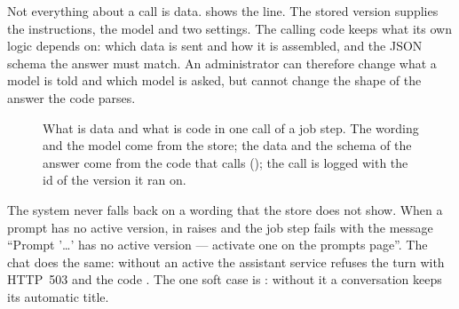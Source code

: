 Not everything about a call is data.  shows the line. The stored
version supplies the instructions, the model and two settings. The calling code keeps what its
own logic depends on: which data is sent and how it is assembled, and the JSON schema the
answer must match. An administrator can therefore change what a model is told and which model
is asked, but cannot change the shape of the answer the code parses.

\begin{figure}[H]
\centering
{}
\actorlegend
\caption{What is data and what is code in one call of a job step. The wording and the model come
from the store; the data and the schema of the answer come from the code that calls
 (); the call is logged with the id of the version it ran
on.}\label{fig:prompts:split}
\end{figure}

The system never falls back on a wording that the store does not show. When a prompt has no
active version,  in  raises
 and the job step fails with the message \enquote{Prompt '…' has no
active version — activate one on the prompts page}. The chat does the same: without an active
 the assistant service refuses the turn with HTTP~503 and the code
. The one soft case is : without it a
conversation keeps its automatic title.


